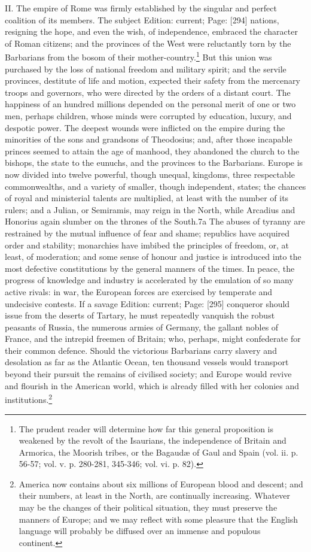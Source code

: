 II. The empire of Rome was firmly established by the singular and perfect coalition of its members. The subject Edition: current; Page: [294] nations, resigning the hope, and even the wish, of independence, embraced the character of Roman citizens; and the provinces of the West were reluctantly torn by the Barbarians from the bosom of their mother-country.\footnote{The prudent reader will determine how far this general proposition is weakened by the revolt of the Isaurians, the independence of Britain and Armorica, the Moorish tribes, or the Bagaudæ of Gaul and Spain (vol. ii. p. 56-57; vol. v. p. 280-281, 345-346; vol. vi. p. 82).} But this union was purchased by the loss of national freedom and military spirit; and the servile provinces, destitute of life and motion, expected their safety from the mercenary troops and governors, who were directed by the orders of a distant court. The happiness of an hundred millions depended on the personal merit of one or two men, perhaps children, whose minds were corrupted by education, luxury, and despotic power. The deepest wounds were inflicted on the empire during the minorities of the sons and grandsons of Theodosius; and, after those incapable princes seemed to attain the age of manhood, they abandoned the church to the bishops, the state to the eunuchs, and the provinces to the Barbarians. Europe is now divided into twelve powerful, though unequal, kingdoms, three respectable commonwealths, and a variety of smaller, though independent, states; the chances of royal and ministerial talents are multiplied, at least with the number of its rulers; and a Julian, or Semiramis, may reign in the North, while Arcadius and Honorius again slumber on the thrones of the South.7a The abuses of tyranny are restrained by the mutual influence of fear and shame; republics have acquired order and stability; monarchies have imbibed the principles of freedom, or, at least, of moderation; and some sense of honour and justice is introduced into the most defective constitutions by the general manners of the times. In peace, the progress of knowledge and industry is accelerated by the emulation of so many active rivals: in war, the European forces are exercised by temperate and undecisive contests. If a savage Edition: current; Page: [295] conqueror should issue from the deserts of Tartary, he must repeatedly vanquish the robust peasants of Russia, the numerous armies of Germany, the gallant nobles of France, and the intrepid freemen of Britain; who, perhaps, might confederate for their common defence. Should the victorious Barbarians carry slavery and desolation as far as the Atlantic Ocean, ten thousand vessels would transport beyond their pursuit the remains of civilised society; and Europe would revive and flourish in the American world, which is already filled with her colonies and institutions.\footnote{America now contains about six millions of European blood and descent; and their numbers, at least in the North, are continually increasing. Whatever may be the changes of their political situation, they must preserve the manners of Europe; and we may reflect with some pleasure that the English language will probably be diffused over an immense and populous continent.}

